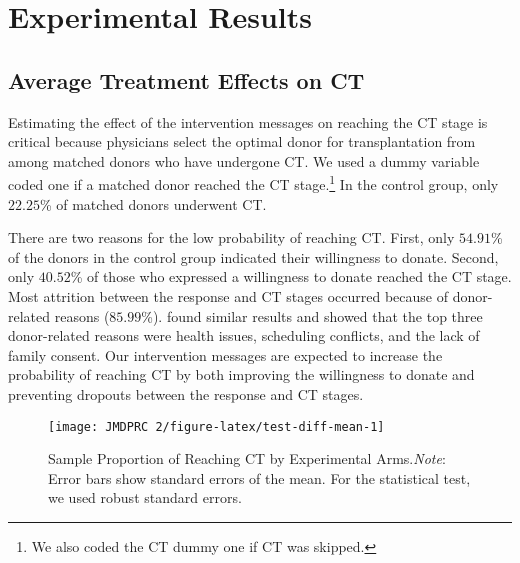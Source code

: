\documentclass[12pt, a4paper]{article}
\begin{document}
\hypertarget{result}{%
\section{Experimental Results}\label{result}}

\hypertarget{main}{%
\subsection{Average Treatment Effects on CT}\label{main}}

Estimating the effect of the intervention messages on reaching the CT stage is critical because physicians select the optimal donor for transplantation from among matched donors who have undergone CT. We used a dummy variable coded one if a matched donor reached the CT stage.\footnote{We also coded the CT dummy one if CT was skipped.} In the control group, only \(22.25\)\% of matched donors underwent CT.

There are two reasons for the low probability of reaching CT. First, only \(54.91\)\% of the donors in the control group indicated their willingness to donate. Second, only \(40.52\)\% of those who expressed a willingness to donate reached the CT stage. Most attrition between the response and CT stages occurred because of donor-related reasons (\(85.99\)\%). \citet{Hirakawa2018} found similar results and showed that the top three donor-related reasons were health issues, scheduling conflicts, and the lack of family consent. Our intervention messages are expected to increase the probability of reaching CT by both improving the willingness to donate and preventing dropouts between the response and CT stages.

\begin{figure}[t]
\texttt{[image: JMDPRC~2/figure-latex/test-diff-mean-1]} \caption{Sample Proportion of Reaching CT by Experimental Arms.\newline \emph{Note}: Error bars show standard errors of the mean. For the statistical test, we used robust standard errors.}\label{fig:test-diff-mean}
\end{figure}
\end{document}
